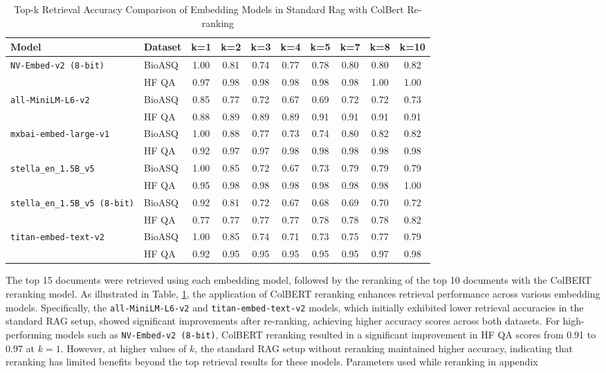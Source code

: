 \documentclass{scrartcl}
\begin{document}
\begin{table}[H]
\centering
\small
\begin{tabular}{l l c c c c c c c c}
\hline
\textbf{Model} & \textbf{Dataset} & \textbf{k=1} & \textbf{k=2} & \textbf{k=3} & \textbf{k=4} & \textbf{k=5} & \textbf{k=7} & \textbf{k=8} & \textbf{k=10} \\
\hline
\multirow{2}{*}{\texttt{NV-Embed-v2 (8-bit)}} 
 & BioASQ & 1.00 & 0.81 & 0.74 & 0.77 & 0.78 & 0.80 & 0.80 & 0.82 \\
 & HF QA  & 0.97 & 0.98 & 0.98 & 0.98 & 0.98 & 0.98 & 1.00 & 1.00 \\
\hline
\multirow{2}{*}{\texttt{all-MiniLM-L6-v2}} 
 & BioASQ & 0.85 & 0.77 & 0.72 & 0.67 & 0.69 & 0.72 & 0.72 & 0.73 \\
 & HF QA  & 0.88 & 0.89 & 0.89 & 0.89 & 0.91 & 0.91 & 0.91 & 0.91 \\
\hline
\multirow{2}{*}{\texttt{mxbai-embed-large-v1}} 
 & BioASQ & 1.00 & 0.88 & 0.77 & 0.73 & 0.74 & 0.80 & 0.82 & 0.82 \\
 & HF QA  & 0.92 & 0.97 & 0.97 & 0.98 & 0.98 & 0.98 & 0.98 & 0.98 \\
\hline
\multirow{2}{*}{\texttt{stella\_en\_1.5B\_v5}} 
 & BioASQ & 1.00 & 0.85 & 0.72 & 0.67 & 0.73 & 0.79 & 0.79 & 0.79 \\
 & HF QA  & 0.95 & 0.98 & 0.98 & 0.98 & 0.98 & 0.98 & 0.98 & 1.00 \\
\hline
\multirow{2}{*}{\texttt{stella\_en\_1.5B\_v5 (8-bit)}} 
 & BioASQ & 0.92 & 0.81 & 0.72 & 0.67 & 0.68 & 0.69 & 0.70 & 0.72 \\
 & HF QA  & 0.77 & 0.77 & 0.77 & 0.77 & 0.78 & 0.78 & 0.78 & 0.82 \\
\hline
\multirow{2}{*}{\texttt{titan-embed-text-v2}} 
 & BioASQ & 1.00 & 0.85 & 0.74 & 0.71 & 0.73 & 0.75 & 0.77 & 0.79 \\
 & HF QA  & 0.92 & 0.95 & 0.95 & 0.95 & 0.95 & 0.95 & 0.97 & 0.98 \\
\hline
\end{tabular}
\caption{Top-k Retrieval Accuracy Comparison of Embedding Models in Standard Rag with ColBert Re-ranking }
\label{table:top_k_reranking_retrieval_accuracy}
\end{table}

The top 15 documents were retrieved using each embedding model, followed by the reranking of the top 10 documents with the ColBERT reranking model. As illustrated in Table, \ref{table:top_k_reranking_retrieval_accuracy}, the application of ColBERT reranking enhances retrieval performance across various embedding models. Specifically, the \texttt{all-MiniLM-L6-v2} and \texttt{titan-embed-text-v2} models, which initially exhibited lower retrieval accuracies in the standard RAG setup, showed significant improvements after re-ranking, achieving higher accuracy scores across both datasets. 
For high-performing models such as \texttt{NV-Embed-v2 (8-bit)}, ColBERT reranking resulted in a significant improvement in HF QA scores from 0.91 to 0.97 at \(k=1\). However, at higher values of \(k\), the standard RAG setup without reranking maintained higher accuracy, indicating that reranking has limited benefits beyond the top retrieval results for these models. Parameters used while reranking in appendix
\end{document}
